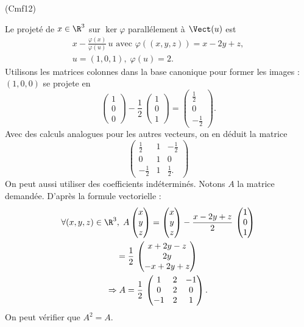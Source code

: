 \begin{tiny}(Cmf12)\end{tiny} Le projeté de $x\in \R^3$ sur $\ker \varphi$ parallélement à $\Vect(u)$ est
\begin{multline*}
 x-\frac{\varphi(x)}{\varphi(u)}\,u \text{ avec } \varphi((x,y,z))= x - 2y + z,\\
 u =(1,0,1), \; \varphi(u) = 2.
\end{multline*}
Utilisons les matrices colonnes dans la base canonique pour former les images : $(1,0,0)$ se projete en
\[
  \begin{pmatrix}
    1 \\ 0 \\ 0
  \end{pmatrix}
- \frac{1}{2}\,\begin{pmatrix}
    1 \\ 0 \\ 1
  \end{pmatrix}
  = \begin{pmatrix}
    \frac{1}{2} \\ 0 \\ -\frac{1}{2}
  \end{pmatrix}.
\]
Avec des calculs analogues pour les autres vecteurs, on en déduit la matrice
\begin{displaymath}
 \begin{pmatrix}
  \frac{1}{2}& 1 & -\frac{1}{2} \\0 & 1 & 0\\ -\frac{1}{2} & 1 & \frac{1}{2}.
 \end{pmatrix}
\end{displaymath}
On peut aussi utiliser des coefficients indéterminés.\newline
Notons $A$ la matrice demandée. D'après la formule vectorielle :
\begin{multline*}
  \forall(x,y,z) \in \R^3,\; 
  A \begin{pmatrix} x \\ y \\ z \end{pmatrix}
  = \begin{pmatrix} x \\ y \\ z \end{pmatrix} - \frac{x - 2y +z}{2}\,\begin{pmatrix} 1 \\ 0 \\ 1 \end{pmatrix} \\
  = \frac{1}{2}\,
  \begin{pmatrix} x + 2y -z \\ 2y \\ -x + 2y +  z \end{pmatrix} \\
  \Rightarrow 
  A = \frac{1}{2}\,
  \begin{pmatrix}
    1 & 2 & -1 \\ 0 & 2 & 0 \\ -1 & 2 & 1
  \end{pmatrix}.
\end{multline*}
On peut vérifier que $A^2 = A$.
